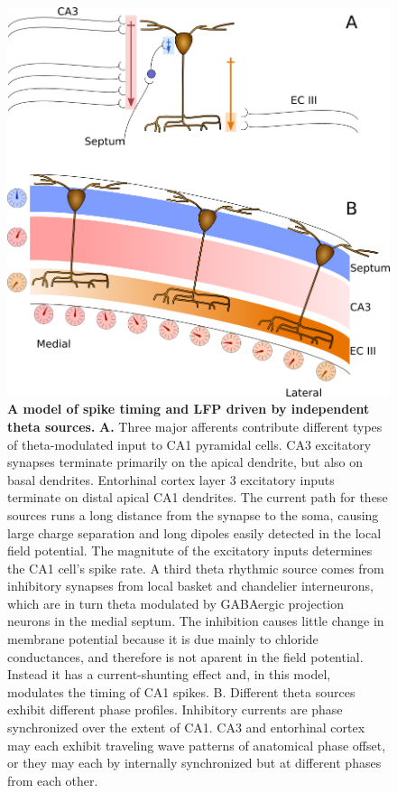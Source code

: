 \documentclass[]{article}
\begin{document}
\begin{figure}[htbp]
\centering
\includegraphics{./finalFigs/travelingwave/LFPModel.png}
\caption{\textbf{A model of spike timing and LFP driven by independent theta sources.}
\textbf{A.} Three major afferents contribute different types of
theta-modulated input to CA1 pyramidal cells. CA3 excitatory synapses
terminate primarily on the apical dendrite, but also on basal dendrites.
Entorhinal cortex layer 3 excitatory inputs terminate on distal apical
CA1 dendrites. The current path for these sources runs a long distance
from the synapse to the soma, causing large charge separation and long
dipoles easily detected in the local field potential. The magnitute of
the excitatory inputs determines the CA1 cell's spike rate. A third
theta rhythmic source comes from inhibitory synapses from local basket
and chandelier interneurons, which are in turn theta modulated by
GABAergic projection neurons in the medial septum. The inhibition causes
little change in membrane potential because it is due mainly to chloride
conductances, and therefore is not aparent in the field potential.
Instead it has a current-shunting effect and, in this model, modulates
the timing of CA1 spikes. B. Different theta sources exhibit different
phase profiles. Inhibitory currents are phase synchronized over the
extent of CA1. CA3 and entorhinal cortex may each exhibit traveling wave
patterns of anatomical phase offset, or they may each by internally
synchronized but at different phases from each other.}
\end{figure}
\end{document}
